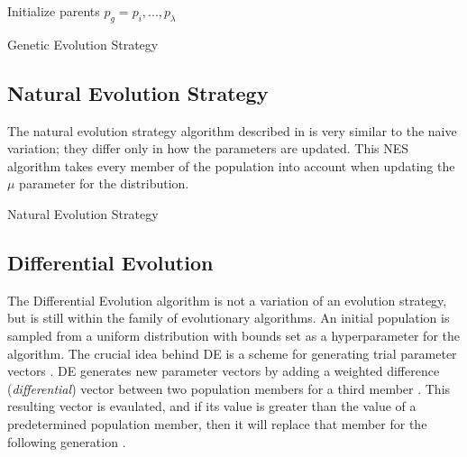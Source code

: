 \documentclass[conference]{IEEEtran}
\begin{document}
\begin{algorithm}[htbp]
\SetAlgoLined
{}
    Initialize parents $p_g = p_i, ..., p_\lambda$ \\
\caption{Genetic Evolution Strategy}
\label{alg:ges}
\end{algorithm}

\subsection{Natural Evolution Strategy}
The natural evolution strategy algorithm described in \cite{openai} is very similar to the naive variation; they differ only in how the parameters 
are updated. This NES algorithm takes every member of the population into account when updating the $\mu$ parameter for the distribution.

\begin{algorithm}[htbp]
\SetAlgoLined
{}
\caption{Natural Evolution Strategy}
\label{alg:nes}
\end{algorithm} \cite{openai}

\subsection{Differential Evolution}
The Differential Evolution algorithm is not a variation of an evolution strategy, but is still within the family of evolutionary algorithms. 
An initial population is sampled from a uniform distribution with bounds set as a hyperparameter for the algorithm. The crucial idea behind DE 
is a scheme for generating trial parameter vectors \cite{de}. DE generates new parameter vectors by adding a weighted difference (\emph{differential}) 
vector between two population members for a third member \cite{de}. This resulting vector is evaulated, and if its value is greater than the value of 
a predetermined population member, then it will replace that member for the following generation \cite{de}. 
\end{document}

